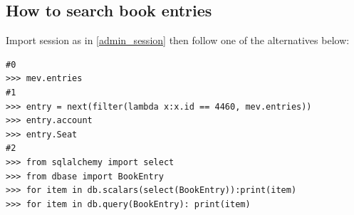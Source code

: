 \documentclass[12pt, a4paper]{article}
\begin{document}
\subsection{How to search  book entries} 
Import session as in \ref{admin_session} then follow one of the alternatives below:
\begin{verbatim}
#0
>>> mev.entries
#1
>>> entry = next(filter(lambda x:x.id == 4460, mev.entries))
>>> entry.account	
>>> entry.Seat
#2
>>> from sqlalchemy import select
>>> from dbase import BookEntry
>>> for item in db.scalars(select(BookEntry)):print(item)
>>> for item in db.query(BookEntry): print(item)
\end{verbatim}
\end{document}
